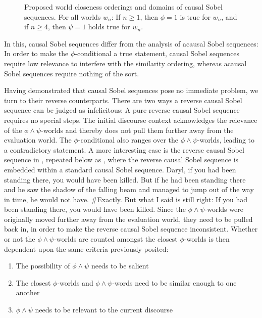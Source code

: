 \begin{figure}[!htb]

\caption{Proposed world closeness orderings and domains of causal Sobel sequences. For all worlds $w_n$: If $n\geqslant1$, then $\phi=1$ is true for $w_n$, and if $n\geqslant 4$, then $\psi=1$ holds true for $w_n$.}
\end{figure}
In this, causal Sobel sequences differ from the analysis of acausal Sobel sequences: In order to make the $\phi$-conditional a true statement, causal Sobel sequences require low relevance to interfere with the similarity ordering, whereas acausal Sobel sequences require nothing of the sort.

Having demonstrated that causal Sobel sequences pose no immediate problem, we turn to their reverse counterparts. There are two ways a reverse causal Sobel sequence can be judged as infelicitous: A pure reverse causal Sobel sequence requires no special steps. The initial discourse context acknowledges the relevance of the $\phi\land\psi$-worlds and thereby does not pull them further away from the evaluation world. The $\phi$-conditional also ranges over the $\phi\land\psi$-worlds, leading to a contradictory statement. A more interesting case is the reverse causal Sobel sequence in , repeated below as , where the reverse causal Sobel sequence is embedded within a standard causal Sobel sequence. 
\pex{}%
			\a	{}Daryl, if you had been standing there, you would have been killed.
			\a	{}But if he had been standing there and he saw the shadow of the falling beam and managed to jump out of the way in time, he would not have.
			\a	{}\#Exactly. But what I said is still right:  If you had been
standing there, you would have been killed.\hfill\parencite[adapted from][p. 153f]{Klecha2014}
\xe
Since the $\phi\land\psi$-worlds were originally moved further away from the evaluation world, they need to be pulled back in, in order to make the reverse causal Sobel sequence inconsistent. Whether or not the $\phi\land\psi$-worlds are counted amongst the closest $\phi$-worlds is then dependent upon the same criteria previously posited: 
\begin{enumerate}
    \item The possibility of $\phi\land\psi$ needs to be salient
    \item The closest $\phi$-worlds and $\phi\land\psi$-words need to be similar enough to one another
    \item $\phi\land\psi$ needs to be relevant to the current discourse 
\end{enumerate}
